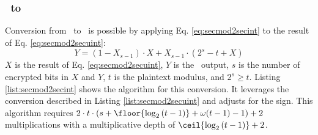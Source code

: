 % 
% 


\subsubsection{\secmod\ to \secint{}}\label{sss:secmod2secint}

Conversion from \secmod\ to \secint\ is possible by applying Eq. \ref{eq:secmod2secint} to the result of Eq. \ref{eq:secmod2secuint}:
\begin{equation}\label{eq:secmod2secint}
    Y = (1 - X_{s-1}) \cdot X + X_{s-1} \cdot (2^s - t + X)
\end{equation}
$X$ is the result of Eq. \ref{eq:secmod2secuint}, $Y$ is the \secint\ output, $s$ is the number of encrypted bits in $X$ and $Y$, $t$ is the plaintext modulus, and $2^s \geq t$.
Listing \ref{list:secmod2secint} shows the algorithm for this conversion. It leverages the conversion described in Listing \ref{list:secmod2secuint} and adjusts for the sign.
This algorithm requires $2 \cdot t \cdot (s + \floor{\log_2{(t-1)}} + \omega(t-1) - 1)+2$ multiplications with a multiplicative depth of $\ceil{\log_2{(t-1)}} + 2$.

